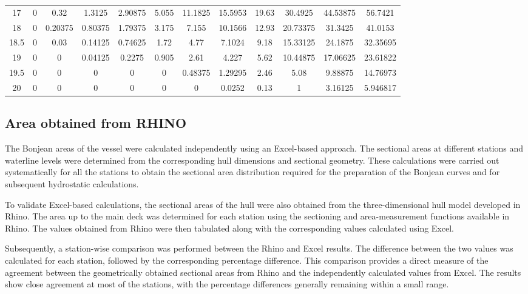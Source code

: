 \documentclass[12pt,a4paper,twoside]{report}
\begin{document}
\begin{table}[H]
{\begin{tabular}{c|ccccccccccc}
17   & 0 & 0.32 & 1.3125 & 2.90875 & 5.055 & 11.1825 & 15.5953 & 19.63 & 30.4925 & 44.53875 & 56.7421 \\
18   & 0 & 0.20375 & 0.80375 & 1.79375 & 3.175 & 7.155 & 10.1566 & 12.93 & 20.73375 & 31.3425 & 41.0153 \\
18.5 & 0 & 0.03 & 0.14125 & 0.74625 & 1.72 & 4.77 & 7.1024 & 9.18 & 15.33125 & 24.1875 & 32.35695 \\
19   & 0 & 0 & 0.04125 & 0.2275 & 0.905 & 2.61 & 4.227 & 5.62 & 10.44875 & 17.06625 & 23.61822 \\
19.5 & 0 & 0 & 0 & 0 & 0 & 0.48375 & 1.29295 & 2.46 & 5.08 & 9.88875 & 14.76973 \\
20   & 0 & 0 & 0 & 0 & 0 & 0 & 0.0252 & 0.13 & 1 & 3.16125 & 5.946817 \\
\bottomrule
\end{tabular}%
}
\end{table}



\subsection{Area obtained from RHINO}
The Bonjean areas of the vessel were calculated independently using an Excel-based approach. The sectional areas at different stations and waterline levels were determined from the corresponding hull dimensions and sectional geometry. These calculations were carried out systematically for all the stations to obtain the sectional area distribution required for the preparation of the Bonjean curves and for subsequent hydrostatic calculations.

\vspace{\baselineskip}\par\noindent To validate Excel-based calculations, the sectional areas of the hull were also obtained from the three-dimensional hull model developed in Rhino. The area up to the main deck was determined for each station using the sectioning and area-measurement functions available in Rhino. The values obtained from Rhino were then tabulated along with the corresponding values calculated using Excel.

\vspace{\baselineskip}\par\noindent Subsequently, a station-wise comparison was performed between the Rhino and Excel results. The difference between the two values was calculated for each station, followed by the corresponding percentage difference. This comparison provides a direct measure of the agreement between the geometrically obtained sectional areas from Rhino and the independently calculated values from Excel. The results show close agreement at most of the stations, with the percentage differences generally remaining within a small range.
\end{document}
